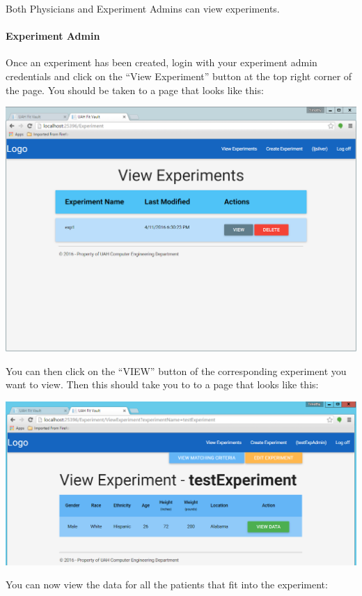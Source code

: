 \documentclass[letterpaper,10pt,english]{sphinxmanual}
\begin{document}
Both Physicians and Experiment Admins can view experiments.


\paragraph{Experiment Admin}
\label{user_guide/experiment_view:experiment-admin}
Once an experiment has been created, login with your experiment admin credentials and click on the ``View Experiment'' button
at the top right corner of the page. You should be taken to a page that looks like this:

\includegraphics{view_experiments.png}

You can then click on the ``VIEW'' button of the corresponding experiment you want to view. Then this should take you
to to a page that looks like this:

\includegraphics{view_experiments_expadmin.png}

You can now view the data for all the patients that fit into the experiment:
\end{document}
